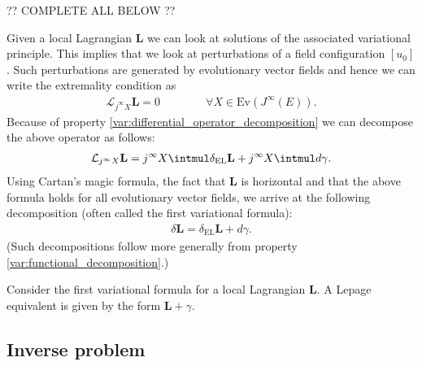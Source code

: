     ?? COMPLETE ALL BELOW ??
    \begin{property}
        Given a local Lagrangian $\mathbf{L}$ we can look at solutions of the associated variational principle. This implies that we look at perturbations of a field configuration $[u_0]$. Such perturbations are generated by evolutionary vector fields and hence we can write the extremality condition as
        \begin{gather}
            \mathcal{L}_{j^\infty X}\mathbf{L} = 0\qquad\qquad\forall X\in\text{Ev}(J^\infty(E)).
        \end{gather}
        Because of property \ref{var:differential_operator_decomposition} we can decompose the above operator as follows:
        \begin{gather}
            \mathcal{L}_{j^\infty X}\mathbf{L} = j^\infty X\intmul\delta_{\text{EL}}\mathbf{L} + j^\infty X\intmul d\gamma.
        \end{gather}
        Using Cartan's magic formula, the fact that $\mathbf{L}$ is horizontal and that the above formula holds for all evolutionary vector fields, we arrive at the following decomposition (often called the first variational formula):
        \begin{gather}
            \label{var:first_variational_formula}
            \delta\mathbf{L} = \delta_{\text{EL}}\mathbf{L} + d\gamma.
        \end{gather}
        (Such decompositions follow more generally from property \ref{var:functional_decomposition}.)
    \end{property}

    \begin{property}
        Consider the first variational formula for a local Lagrangian $\mathbf{L}$. A Lepage equivalent is given by the form $\mathbf{L}+\gamma$.
    \end{property}

\subsection{Inverse problem}

